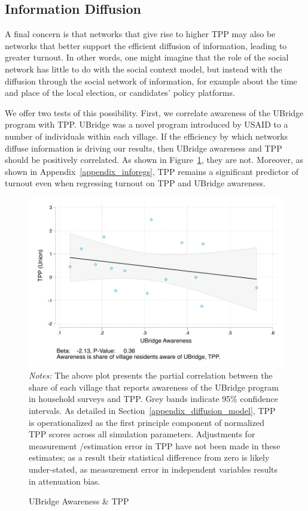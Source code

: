 \documentclass[12pt]{article}
\begin{document}

\subsection{Information Diffusion}

A final concern is that networks that give rise to higher TPP may also be networks that better support the efficient diffusion of information, leading to greater turnout. In other words, one might imagine that the role of the social network has little to do with the social context model, but instead with the diffusion through the social network of information, for example about the time and place of the local election, or candidates' policy platforms.

We offer two tests of this possibility. First, we correlate awareness of the UBridge program with TPP. UBridge was a novel program introduced by USAID to a number of individuals within each village. If the efficiency by which networks diffuse information is driving our results, then UBridge awareness and TPP should be positively correlated. As shown in Figure~\ref{figure_ubridge_turnout}, they are not. Moreover, as shown in Appendix~\ref{appendix_inforegs}, TPP remains a significant predictor of turnout even when regressing turnout on TPP and UBridge awareness.



\begin{figure}[!h]
    \caption{UBridge Awareness \& TPP}\label{figure_ubridge_turnout}
    \includegraphics[width=\textwidth]{../3_results/ubridge_awareness_tpp.pdf}
	\scriptsize{\emph{Notes:} The above plot presents the partial correlation between the share of each village that reports awareness of the UBridge program in household surveys and TPP.  Grey bands indicate 95\% confidence intervals. As detailed in Section~\ref{appendix_diffusion_model}, TPP is operationalized as the first principle component of normalized TPP scores across all simulation parameters. Adjustments for measurement /estimation error in TPP have not been made in these estimates; as a result their statistical difference from zero is likely under-stated, as measurement error in independent variables results in attenuation bias.}
\end{figure}
\end{document}
